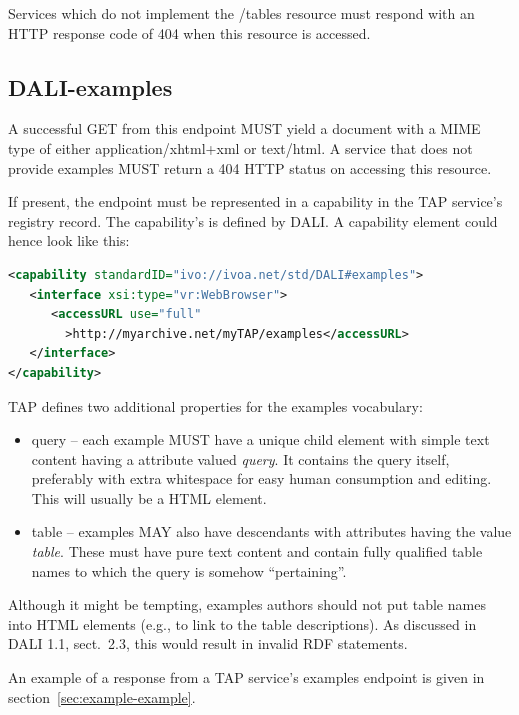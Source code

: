 \documentclass[11pt,letter]{ivoa}
\begin{document}
Services which do not implement the /tables resource must respond with an HTTP 
response code of 404 when this resource is accessed.

\subsection{DALI-examples}
\label{sec:dali-examples}

A successful GET from this endpoint MUST yield a document with a MIME type of either 
application/xhtml+xml or text/html. A service that does not provide examples 
MUST return a 404 HTTP status on accessing this resource.

If present, the endpoint must be represented in a capability in the TAP 
service's registry record. The capability's  is defined by
DALI. A capability element could hence look like this:

\begin{lstlisting}[language=XML,basicstyle=\footnotesize]
<capability standardID="ivo://ivoa.net/std/DALI#examples">
   <interface xsi:type="vr:WebBrowser">
      <accessURL use="full"
        >http://myarchive.net/myTAP/examples</accessURL>
   </interface>
</capability>
\end{lstlisting}

TAP defines two additional properties for the examples vocabulary:

\begin{itemize}
\item query -- each example MUST have a unique child element with simple text 
content having a  attribute valued {\em query}. It contains the query itself, 
preferably with extra whitespace for easy human consumption and editing. This 
will usually be a HTML  element.
    
\item table -- examples MAY also have descendants with  attributes having 
the value {\em table}. These must have pure text content and contain fully qualified 
table names to which the query is somehow ``pertaining''.
\end{itemize}

Although it might be tempting, examples authors should not put table
names into HTML  elements (e.g., to link to the table
descriptions).  As discussed in DALI 1.1, sect.~2.3, this would result
in invalid RDF statements.

An example of a response from a TAP service's examples endpoint is given
in section~\ref{sec:example-example}.
\end{document}

